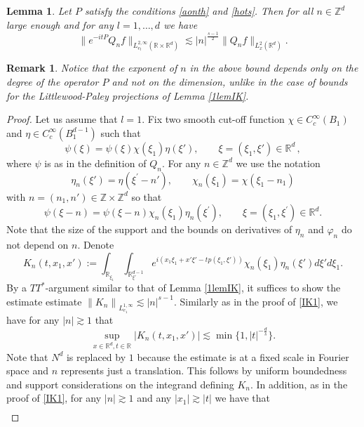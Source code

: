 \documentclass[10pt,leqno]{amsart}
\newtheorem{lem}[thm]{Lemma} %
\newtheorem{rmq}[thm]{Remark} %
\newcommand{\R}{\mathbb{R}} %
\numberwithin{equation}{section}
\newcommand{\Z}{\mathbb{Z}}
\begin{document}
\begin{lem}
\label{lemIO}
Let \(P\) satisfy the conditions \eqref{aonth} and \eqref{hots}. Then for all $n\in \Z^d$ large enough and for any $l=1,\ldots ,d$ we have 
\begin{equation*}
\|e^{-it P } Q_n f\|_{L_{e_l}^{2,\infty} (\R \times \R^d)}\lesssim |n|^{\frac{s-1}{2}} \|Q_n f\|_{L_x^2 (\R^d )}.
\end{equation*}
\end{lem}
\begin{rmq}
Notice that the exponent of \(n\) in the above bound depends only on the degree of the operator \(P\) and not on the dimension, unlike in the case of bounds for the Littlewood-Paley projections of Lemma \ref{1lemIK}.
\end{rmq}

\begin{proof}
Let us assume that \(l=1\). Fix two smooth cut-off function $\chi\in C^{\infty}_{c}(B_{1})$ and $\eta\in C^{\infty}_{c}(B_{1}^{d-1})$ such that 
$$\psi (\xi)= \psi (\xi) \chi (\xi_1) \eta (\xi') ,\qquad \xi= (\xi_1 ,\xi') \in \R^d \,,$$
where $\psi$ is as in the definition of $Q_n$. For any $n \in \Z^d$ we use the notation
\begin{equation*}
\eta_{n} (\xi') = \eta (\xi^\prime - n'),\qquad \chi_n (\xi_1) = \chi(\xi_1 - n_{1})
\end{equation*}
with \(n=(n_{1},n')\in\Z\times\Z^{d}\) so that
$$\psi (\xi -n)= \psi (\xi -n) \chi_n (\xi_1) \eta_n (\xi^\prime) ,\qquad \xi= (\xi_1 ,\xi^\prime) \in \R^d .$$
Note that the size of the support and the bounds on derivatives of $\eta_n$ and $\varphi_n$ do not depend on $n$. Denote 
$$
K_n(t,x_1, x') := \int_{\R_{\xi_1} }  \int_{\R_{\xi'}^{d-1} }e^{i (x_1 \xi_1 +x' \xi'-t p(\xi_1 , \xi')  )} \chi_n (\xi_1) \eta_n (\xi' ) d\xi' d \xi_1.
$$
By a $TT^\ast$-argument similar to that of  Lemma \ref{1lemIK}, it suffices to  show the estimate estimate $\left\|K_n\right\|_{L_{e_{1}}^{1,\infty}}\lesssim|n|^{s-1}$. Similarly as in the proof of \eqref{IK1}, we have for any $|n| \gtrsim 1$ that
$$\sup_{x \in \R^{d} ,t\in \R} |K_n (t,x_1, x')| \lesssim \min \{1, |t|^{-\frac{d}{s}}\}. $$
Note that $N^d$ is replaced by $1$ because the estimate is at a fixed scale in Fourier space and $n$ represents just a translation. This follows by uniform boundedness and support considerations on the integrand defining \(K_{n}\). In addition, as in  the proof of \eqref{IK1}, for any $|n| \gtrsim 1$ and any $|x_1| \gtrsim|t|$ we have that
\begin{align*}

\end{align*}
\end{proof}
\end{document}
